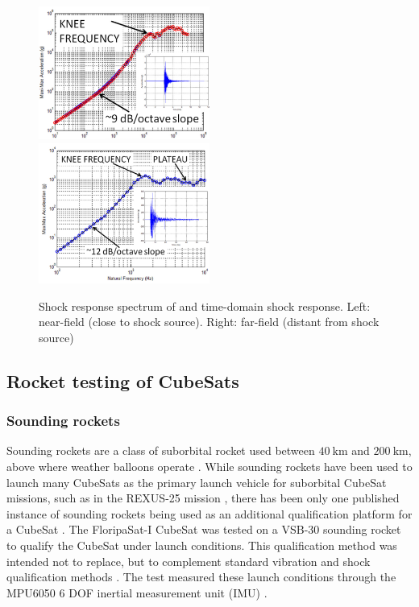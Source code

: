 \documentclass[a4paper,11pt]{article}
\begin{document}
\begin{figure}[H]
  \includegraphics[width=0.5\textwidth]{images/pyroshock2.png}
  \includegraphics[width=0.5\textwidth]{images/pyroshock1.png}
  \caption{Shock response spectrum of and time-domain shock response. Left: near-field (close to shock source). Right: far-field (distant from shock source) \cite{nasa-pyroshock}}
  \label{fig:pyroshock}
\end{figure}


\subsection{Rocket testing of CubeSats}
\subsubsection{Sounding rockets}
Sounding rockets are a class of suborbital rocket used between $\SI{40}{\kilo\meter}$ and $\SI{200}{\kilo\meter}$, above where weather balloons operate \cite{seibert2006history}. While sounding rockets have been used to launch many CubeSats as the primary launch vehicle for suborbital CubeSat missions, such as in the REXUS-25 mission \cite{pont2019rexus}, there has been only one published instance of sounding rockets being used as an additional qualification platform for a CubeSat \cite{slongo2019pre}. The FloripaSat-I CubeSat was tested on a VSB-30 sounding rocket \cite{slongo2019pre} to qualify the CubeSat under launch conditions. This qualification method was intended not to replace, but to complement standard vibration and shock qualification methods \cite{slongo2019pre}. The test measured these launch conditions through the MPU6050 6 DOF inertial measurement unit (IMU) \cite{slongo2019pre}.
\end{document}
